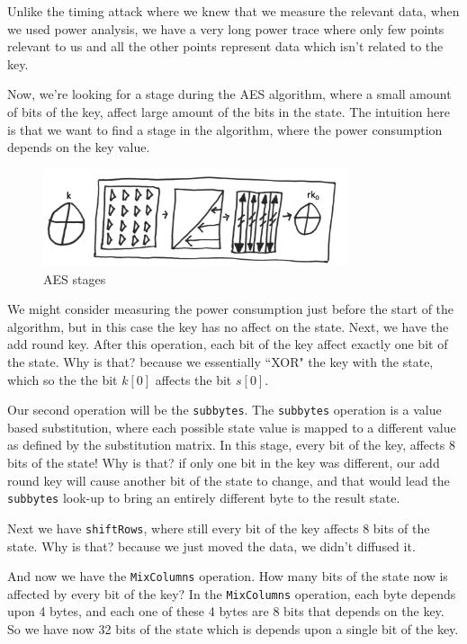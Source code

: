 Unlike the timing attack where we knew that we measure the relevant data, when
we used power analysis, we have a very long power trace where only few points
relevant to us and all the other points represent data which isn't related to
the key.

Now, we're looking for a stage during the AES algorithm, where a small amount of
bits of the key, affect large amount of the bits in the state. The intuition
here is that we want to find a stage in the algorithm, where the power
consumption depends on the key value.

\begin{figure}[!ht]
    \centering
    \includegraphics[width=0.8\textwidth]{images/Lecture6/AES-stages-figure.png}
    \caption{AES stages} \label{fig:aes-stages}
\end{figure}

We might consider measuring the power consumption just before the start of the
algorithm, but in this case the key has no affect on the state. Next, we have
the add round key. After this operation, each bit of the key affect exactly one
bit of the state. Why is that? because we essentially ``XOR" the key with the
state, which so the the bit $k[0]$ affects the bit $s[0]$.

Our second operation will be the \texttt{subbytes}. The \texttt{subbytes}
operation is a value based substitution, where each possible state value is
mapped to a different value as defined by the substitution matrix. In this
stage, every bit of the key, affects 8 bits of the state! Why is that? if only
one bit in the key was different, our add round key will cause another bit of
the state to change, and that would lead the \texttt{subbytes} look-up to bring
an entirely different byte to the result state.

Next we have \texttt{shiftRows}, where still every bit of the key affects 8 bits
of the state. Why is that? because we just moved the data, we didn't diffused
it.

And now we have the \texttt{MixColumns} operation. How many bits of the state
now is affected by every bit of the key? In the \texttt{MixColumns} operation,
each byte depends upon 4 bytes, and each one of these 4 bytes are 8 bits that
depends on the key. So we have now 32 bits of the state which is depends upon a
single bit of the key.

